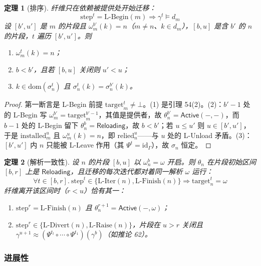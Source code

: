\documentclass[11pt,a4paper]{article}
\theoremstyle{plain}
\newtheorem{theorem}{定理}
\theoremstyle{definition}
\theoremstyle{remark}
\begin{document}
\begin{theorem}[排序]
纤维只在依赖被提供处开始迁移：
\[
\mathrm{step}^t = \text{L-Begin}(m) \Rightarrow \gamma^t \models d_m \tag{58}
\]
设 $[b', u']$ 是 $m$ 的片段且 $\omega_m^{b'}(k) = n$（$m \neq n$、$k \in d_m$），$[b, u]$ 是含 $b'$ 的 $n$ 的片段，$t$ 遍历 $[b', u']$。则
\begin{enumerate}
\item $\omega_m^t(k) = n$；
\item $b < b'$，且若 $[b, u]$ 关闭则 $u' < u$；
\item $k \in \mathrm{dom}(\sigma_n^t)$ 且 $\sigma_n^t(k) = \sigma_n^{b'}(k)$。
\end{enumerate}
\end{theorem}

\begin{proof}
第一断言是 L-Begin 前提 $\mathrm{target}_m^t \neq \bot$。(1) 是引理 54(2)。(2)：$b'-1$ 处的 L-Begin 写 $\omega_m^{b'} = \mathrm{target}_m^{b'-1}$，其值是提供者，故 $\theta_n^{b'} = \mathsf{Active}(-,-)$，而 $b-1$ 处的 L-Begin 留下 $\theta_n^b = \mathsf{Reloading}$，故 $b < b'$；若 $u \le u'$ 则 $u \in [b', u']$，于是 $\mathrm{installed}_m^u$ 且 $\omega_m^u(k) = n$，即 $\mathrm{relied}_n^u$——与 $u$ 处的 L-Unload 矛盾。(3)：$[b', u']$ 内 $n$ 只能被 L-Leave 作用（其 $\Psi^t = \mathrm{id}_\Gamma$），故 $\sigma_n$ 恒定。
\end{proof}

\begin{theorem}[解析一致性]
设 $n$ 的片段 $[b, u]$ 以 $\omega_n^b = \omega$ 开启。则 $\theta_n$ 在片段初始区间 $[b, r]$ 上是 $\mathsf{Reloading}$，且迁移的每次迭代都对着同一解析 $\omega$ 运行：
\[
\forall t \in [b, r].\ \mathrm{step}^t \in \{\text{L-Iter}(n), \text{L-Finish}(n)\} \Rightarrow \mathrm{target}_n^t = \omega \tag{59}
\]
纤维离开该区间时（$r < u$）恰有其一：
\begin{enumerate}
\item $\mathrm{step}^r = \text{L-Finish}(n)$ 且 $\theta_n^{r+1} = \mathsf{Active}(-,\omega)$；
\item $\mathrm{step}^r \in \{\text{L-Divert}(n), \text{L-Raise}(n)\}$，片段在 $u > r$ 关闭且 $\gamma^{u+1} \approx (\Psi^{t_l} \circ \cdots \circ \Psi^{t_1})(\gamma^b)$（如推论 62）。
\end{enumerate}
\end{theorem}

\subsubsection{进展性}
\end{document}
